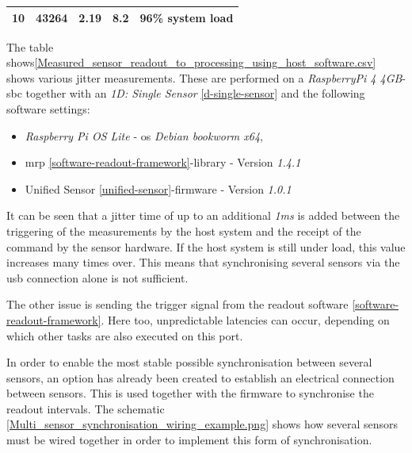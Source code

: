 \begin{longtable}[]{@{}lllll@{}}
\begin{minipage}[t]{0.08\columnwidth}\raggedright
10\strut
\end{minipage} & \begin{minipage}[t]{0.11\columnwidth}\raggedright
43264\strut
\end{minipage} & \begin{minipage}[t]{0.35\columnwidth}\raggedright
2.19\strut
\end{minipage} & \begin{minipage}[t]{0.22\columnwidth}\raggedright
8.2\strut
\end{minipage} & \begin{minipage}[t]{0.10\columnwidth}\raggedright
96\% system load\strut
\end{minipage}\tabularnewline
\bottomrule
\end{longtable}

The table
shows\ref{Measured_sensor_readout_to_processing_using_host_software.csv}
shows various jitter measurements. These are performed on a
\emph{RaspberryPi 4 4GB}-\gls{sbc} together with an \emph{1D: Single
Sensor} \ref{d-single-sensor} and the following software settings:

\begin{itemize}
\tightlist
\item
  \emph{Raspberry Pi OS Lite} - \gls{os} \emph{Debian bookworm x64},
\item
  \gls{mrp} \ref{software-readout-framework}-library - Version
  \emph{1.4.1}
\item
  Unified Sensor \ref{unified-sensor}-firmware - Version \emph{1.0.1}
\end{itemize}

It can be seen that a jitter time of up to an additional \emph{1ms} is
added between the triggering of the measurements by the host system and
the receipt of the command by the sensor hardware. If the host system is
still under load, this value increases many times over. This means that
synchronising several sensors via the \gls{usb} connection alone is not
sufficient.

The other issue is sending the trigger signal from the readout software
\ref{software-readout-framework}. Here too, unpredictable latencies can
occur, depending on which other tasks are also executed on this port.

In order to enable the most stable possible synchronisation between
several sensors, an option has already been created to establish an
electrical connection between sensors. This is used together with the
firmware to synchronise the readout intervals. The schematic
\ref{Multi_sensor_synchronisation_wiring_example.png} shows how several
sensors must be wired together in order to implement this form of
synchronisation.

